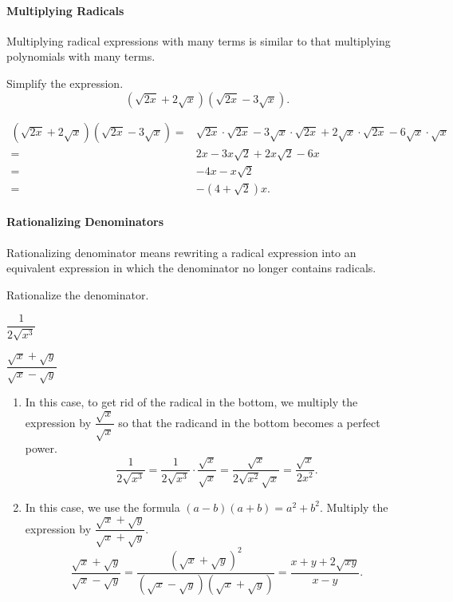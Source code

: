 \paragraph*{Multiplying Radicals}
	Multiplying radical expressions with many terms is similar to that multiplying polynomials with many terms.

	\begin{example}
		Simplify the expression.
		\[
			(\sqrt{2x}+2\sqrt{x})(\sqrt{2x}-3\sqrt{x}).
		\]
	\end{example}
	\begin{solution}
		\[
			\begin{split}
				(\sqrt{2x}+2\sqrt{x})(\sqrt{2x}-3\sqrt{x})=&\sqrt{2x}\cdot\sqrt{2x}-3\sqrt{x}\cdot\sqrt{2x}+2\sqrt{x}\cdot\sqrt{2x}-6\sqrt{x}\cdot\sqrt{x}\\
				=&2x-3x\sqrt{2}+2x\sqrt{2}-6x\\
				=&-4x-x\sqrt{2}\\
				=&-(4+\sqrt{2})x.
			\end{split}
		\]
	\end{solution}



\paragraph*{Rationalizing Denominators}
	Rationalizing denominator means rewriting a radical expression into an equivalent expression in which the denominator no longer contains radicals.

	\begin{example}
		Rationalize the denominator.\\
		\begin{enumerate*}[label={(\arabic*)~}]
			\item $\dfrac{1}{2\sqrt{x^3}}$
			\item $\dfrac{\sqrt{x}+\sqrt{y}}{\sqrt{x}-\sqrt{y}}$\hfill\null
		\end{enumerate*}
	\end{example}
	\begin{solution}\mbox{}
		\begin{enumerate}[label={\emph{(\arabic*)}~}]
			\item In this case, to get rid of the radical in the bottom, we multiply the expression by $\dfrac{\sqrt{x}}{\sqrt{x}}$ so that the radicand in the bottom becomes a perfect power.
			      \[
					\dfrac{1}{2\sqrt{x^3}}=\dfrac{1}{2\sqrt{x^3}}\cdot\dfrac{\sqrt{x}}{\sqrt{x}}=\dfrac{\sqrt{x}}{2\sqrt{x^2}\sqrt{x}}=\dfrac{\sqrt{x}}{2x^2}.  
				  \]
			\item In this case, we use the formula $(a-b)(a+b)=a^2+b^2$. Multiply the expression by $\dfrac{\sqrt{x}+\sqrt{y}}{\sqrt{x}+\sqrt{y}}$.
			      \[
				      \dfrac{\sqrt{x}+\sqrt{y}}{\sqrt{x}-\sqrt{y}}=\dfrac{(\sqrt{x}+\sqrt{y})^2}{(\sqrt{x}-\sqrt{y})(\sqrt{x}+\sqrt{y})}=\dfrac{x+y+2\sqrt{xy}}{x-y}.
			      \]
		\end{enumerate}
	\end{solution}




